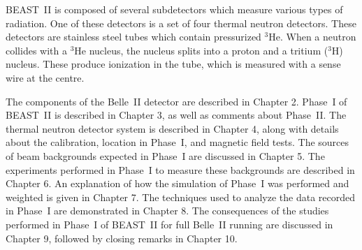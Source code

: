 BEAST~II is composed of several subdetectors which measure various types of radiation. One of these detectors is a set of four thermal neutron detectors. These detectors are stainless steel tubes which contain pressurized $^3$He. When a neutron collides with a $^3$He nucleus, the nucleus splits into a proton and a tritium ($^3$H) nucleus. These produce ionization in the tube, which is measured with a sense wire at the centre.





The components of the Belle~II detector are described in Chapter 2. Phase~I of BEAST~II is described in Chapter 3, as well as comments about Phase~II. The \he thermal neutron detector system is described in Chapter 4, along with details about the calibration, location in Phase~I, and magnetic field tests. The sources of beam backgrounds expected in Phase~I are discussed in Chapter 5. The experiments performed in Phase~I to measure these backgrounds are described in Chapter 6. An explanation of how the simulation of Phase~I was performed and weighted is given in Chapter 7. The techniques used to analyze the data recorded in Phase~I are demonstrated in Chapter 8. The consequences of the studies performed in Phase~I of BEAST~II for full Belle~II running are discussed in Chapter 9, followed by closing remarks in Chapter 10.





